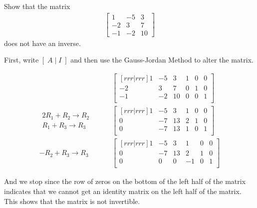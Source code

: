 \begin{example}
Show that the matrix 
%
\begin{align*}
\begin{bmatrix}
1 & -5 & 3 \\
-2 & 3 & 7 \\
-1 & -2 & 10 
\end{bmatrix}
\end{align*}
does not have an inverse. 

\solution

First, write $[\;A\;|\;I\;]$ and then use the Gauss-Jordan Method to alter the matrix. 

\begin{align*}
& \qquad \begin{bmatrix}[rrr|rrr]
1 & -5 & 3 & 1 & 0 & 0 \\
-2 & 3 & 7 & 0 & 1 & 0 \\
-1 & -2 & 10 & 0 & 0 & 1  \\
\end{bmatrix} \\
\begin{array}{r}
2 R_1 + R_2 \rightarrow R_2 \\
 R_1 + R_3 \rightarrow R_3
\end{array} & \qquad
\begin{bmatrix}[rrr|rrr]
1 & -5 & 3 & 1 & 0 & 0 \\
0 & -7 & 13 & 2 & 1 & 0 \\
0 & -7 & 13 & 1 & 0 &  1 \\
\end{bmatrix} \\
-R_2 + R_3 \rightarrow R_3 & \qquad
\begin{bmatrix}[rrr|rrr]
1 & -5 & 3 & 1 & 0 & 0 \\
0 & -7 & 13 & 2 & 1 & 0 \\
0 & 0 & 0 & -1 & 0 &  1 \\
\end{bmatrix}
\end{align*}

And we stop since the row of zeros on the bottom of the left half of the matrix indicates that  we cannot get an identity matrix on the left half of the matrix.  This shows that the matrix is not invertible.  
\end{example}



